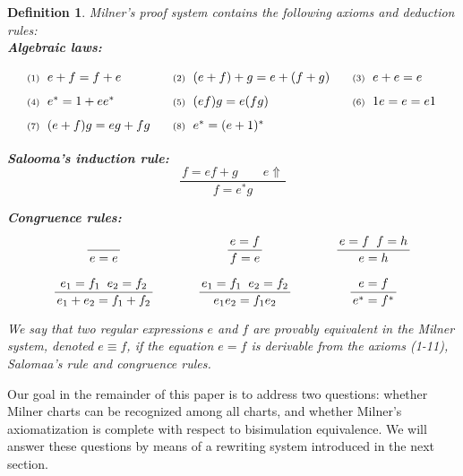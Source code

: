 \documentclass{article}
\newtheorem{definition}{Definition}[section]
\begin{document}
\begin{definition} \emph{Milner's proof system} 
    contains the following axioms and deduction rules:~\\
    
\textbf{Algebraic laws:}
\[
\renewcommand{\arraystretch}{1.6} %
\begin{array}{@{\hspace{3pt}}r@{\hspace{6pt}}l
                  @{\hspace{18pt}}r@{\hspace{6pt}}l
                  @{\hspace{18pt}}r@{\hspace{6pt}}l}
\text{\scriptsize (1)}  & e + f = f + e
  & \text{\scriptsize (2)}  & (e + f) + g = e + (f + g)
  & \text{\scriptsize (3)}  & e + e = e
\\
\text{\scriptsize (4)}  & e^* = 1 + e e^*
  & \text{\scriptsize (5)}  & (ef)g = e(fg)
  & \text{\scriptsize (6)}  & 1e = e = e1
\\
\text{\scriptsize (7)}  & (e+f)g = eg + fg
  & \text{\scriptsize (8)}  & e^* = (e+1)^*
\end{array}
\]

\textbf{Salooma's induction rule:}
\vspace{.5em}
\[
\frac{\, f= ef + g\qquad e\Uparrow\,}{\,f=e^*g\,}
\]

\textbf{Congruence rules:}
\[
\renewcommand{\arraystretch}{1.8}
\begin{array}{c@{\hspace{35pt}}c@{\hspace{35pt}}c}
\dfrac{}{\,e = e\,} 
  & \dfrac{\,e = f\,}{\,f = e\,} 
  & \dfrac{\,e = f \;\; f = h\,}{\,e = h\,} \\[12pt]
\dfrac{\,e_1 = f_1 \;\; e_2 = f_2\,}{\,e_1 + e_2 = f_1 + f_2\,}
  & \dfrac{\,e_1 = f_1 \;\; e_2 = f_2\,}{\,e_1 e_2 = f_1 e_2\,}
  & \dfrac{\,e = f\,}{\,e^{*} = f^{*}\,}
\end{array}
\]
\vspace{1em}

We say that two regular expressions $e$ and $f$ are \emph{provably equivalent} in the Milner system, denoted $e \equiv f$, if the equation $e = f$ is derivable from the axioms (1-11), Salomaa's  rule and congruence rules.
\end{definition}


Our goal in the remainder of this paper is to address two questions:  
whether Milner charts can be recognized among all charts,  
and whether Milner’s axiomatization is complete with respect to bisimulation equivalence.  
We will answer these questions by means of a rewriting system introduced in the next section.
\end{document}
